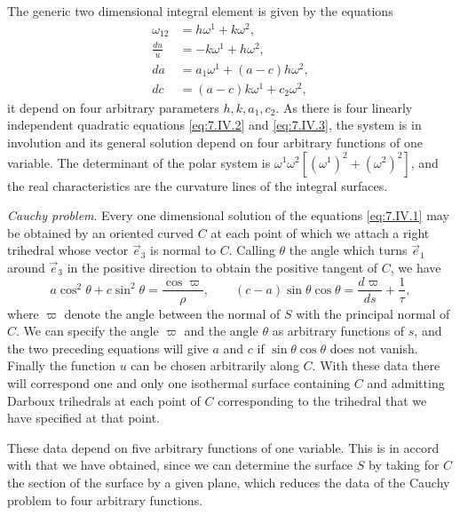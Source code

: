 \documentclass[leqno,11pt]{book}
\numberwithin{equation}{chapter}
\theoremstyle{shape1}
\theoremstyle{shape0}
\theoremstyle{shape2}
\theoremstyle{definition}
\begin{document}
The generic two dimensional integral element is given by the equations
\begin{align*}
  \omega_{12}&=h\omega^{1}+k\omega^{2},\\
  \frac{du}{u}&=-k\omega^{1}+h\omega^{2},\\
  da&=a_{1}\omega^{1}+(a-c)h\omega^{2},\\
  dc&=(a-c)k\omega^{1}+c_{2}\omega^{2},
\end{align*}
it depend on four arbitrary parameters $h, k, a_{1}, c_{2}$. As there is four linearly independent quadratic equations \eqref{eq:7.IV.2} and \eqref{eq:7.IV.3}, the system is in involution and its general solution depend on four arbitrary functions of one variable. The determinant of the polar system is $\omega^{1}\omega^{2}[(\omega^{1})^{2}+(\omega^{2})^{2}]$, and the real characteristics are the curvature lines of the integral surfaces.




\vspace{12pt}\fsec\emph{Cauchy problem}. Every one dimensional solution of the equations \eqref{eq:7.IV.1} may be obtained by an oriented curved $C$ at each point of which we attach a right trihedral whose vector $\vec e_{3}$ is normal to $C$. Calling $\theta$ the angle which turns $\vec e_{1}$ around $\vec e_{3}$ in the positive direction to obtain the positive tangent of $C$, we have
\begin{equation}
  \label{eq:7.IV.4}\tag{IV, 4}
  a\cos^{2}\theta+c\sin^{2}\theta=\frac{\cos\varpi}{\rho},\qquad(c-a)\sin\theta\cos\theta=\frac{d\varpi}{ds}+\frac{1}{\tau},
\end{equation}
where $\varpi$ denote the angle between the normal of $S$ with the principal normal of $C$. We can specify the angle $\varpi$ and the angle $\theta$ as arbitrary functions of $s$, and the two preceding equations will give $a$ and $c$ if $\sin\theta\cos\theta$ does not vanish. Finally the function $u$ can be chosen arbitrarily along $C$. With these data there will correspond one and only one isothermal surface containing $C$ and admitting Darboux trihedrals at each point of $C$ corresponding to the trihedral that we have specified at that point.

These data depend on five arbitrary functions of one variable. This is in accord with that we have obtained, since we can determine the surface $S$ by taking for $C$ the section of the surface by a given plane, which reduces the data of the Cauchy problem to four arbitrary functions.
\end{document}
